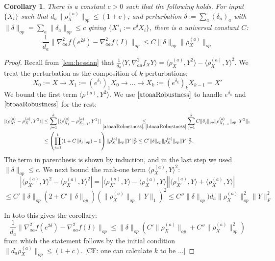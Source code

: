 \documentclass{article}
\newtheorem{corollary}[theorem]{Corollary}
\renewcommand{\vec}{\bm}
\newcommand{\CF}[1]{{\color{purple}[CF: #1]}}
\begin{document}
\begin{corollary} \label{diagRobustness}
There is a constant $c>0$ such that the following holds. For input $\{X_{i}\}$ such that $d_{a}\|\rho_{X}^{(a)}\|_{op} \leq (1+c)$; and perturbation $\delta := \sum_{a} (\delta_{a})_{a}$ with $\|\delta\|_{op} = \sum_{a} \|\delta_{a}\|_{op} \leq c$ giving $\{X'_{i} := e^{\delta} X_{i} \}$, there is a universal constant $C$:
\[ \frac{1}{d_{a}} \|\nabla^{2}_{aa} f(e^{2\delta}) - \nabla^{2}_{aa} f(I)\|_{op} \leq C \|\delta\|_{op} \|\rho_{X}^{(a)}\|_{op}      \]
\end{corollary}
\begin{proof}
Recall from \cref{lem:hessian} that $\frac{1}{d_{a}}\langle Y, \nabla^{2}_{aa} f_{X} Y \rangle = \langle \rho_{X}^{(a)}, Y^{2} \rangle - \langle \rho_{X}^{(a)}, Y \rangle^{2}$. We treat the perturbation as the composition of $k$ perturbations; 
\[ X_{0}:=X \to X_{1}:= (e^{\delta_{1}})_1 X_{0} \to ... \to X_{k}:=(e^{\delta_{k}})_{k} X_{k-1} = X'  \]
We bound the first term $\langle \rho^{(a)}, Y^{2} \rangle$. We use $\ref{atoaaRobustness}$ to handle $e^{\delta_{a}}$ and $\ref{btoaaRobustness}$ for the rest:
\begin{align*}
 |\langle \rho_{X'}^{(a)} - \rho_{X}^{(a)}, Y^{2} \rangle| 
 &\leq \sum_{j=1}^{k} |\langle \rho_{X_{j}}^{(a)} - \rho_{X_{j-1}}^{(a)}, Y^{2} \rangle| 
\underset{\ref{atoaaRobustness},\;\ref{btoaaRobustness}}{\leq} \sum_{j=1}^{k}  C\|\delta_{j}\|_{op} \|\rho_{X_{j-1}}^{(a)}\|_{op} \|Y^{2}\|_{1} \\
& \leq \left( \prod_{j=1}^k (1+C\|\delta_{j}\|_{op}) - 1 \right) \|\rho_{X}^{(a)}\|_{op} \|Y\|_{F}^{2} \leq C' \|\delta\|_{op} \|\rho_{X}^{(a)}\|_{op} \|Y\|_{F}^{2}.   \end{align*}
The term in parenthesis is shown by induction, and in the last step we used $\|\delta\|_{op} \leq c$. We next bound the rank-one term $\langle \rho_{X}^{(a)}, Y \rangle^{2}$:
\[ |\langle \rho_{X'}^{(a)}, Y \rangle^{2} - \langle \rho_{X}^{(a)}, Y \rangle^{2}| = |\langle \rho_{X'}^{(a)}, Y \rangle - \langle \rho_{X}^{(a)}, Y \rangle| |\langle \rho_{X'}^{(a)}, Y \rangle + \langle \rho_{X}^{(a)}, Y \rangle|    \]
\[ \leq C' \|\delta\|_{op} (2+C' \|\delta\|_{op}) (\|\rho_{X}^{(a)}\|_{op} \|Y\|_{1})^{2} \leq C'' \|\delta\|_{op}) d_{a} \|\rho_{X}^{(a)}\|_{op}^{2} \|Y\|_{F}^{2}       \]

In toto this gives the corollary:
\[ \frac{1}{d_{a}}\|\nabla^{2}_{aa} f(e^{2\delta}) - \nabla^{2}_{aa} f(I)\|_{op} \leq \|\delta\|_{op}(C' \|\rho_{X}^{(a)}\|_{op} + C'' \|\rho_{X}^{(a)}\|_{op}^{2})    \]
from which the statement follows by the initial condition $\|d_{a} \rho_{X}^{(a)}\|_{op} \leq (1+c)$.
\CF{one can calculate $k$ to be ...}
\end{proof}
\end{document}
